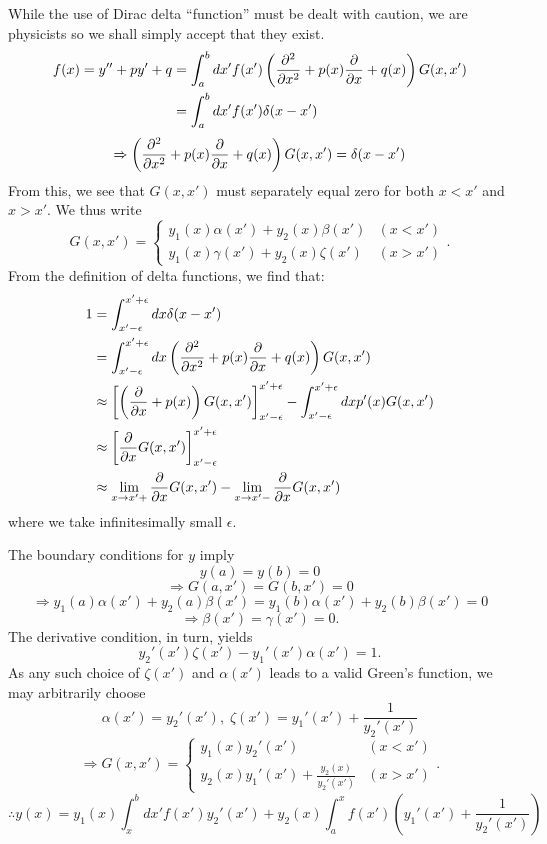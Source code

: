 \item
While the use of Dirac delta ``function'' must be dealt with caution,
we are physicists so we shall simply accept that they exist.
\begin{align*}
	f(x)
	= y'' + py' + q
	&= \int_a^b dx' f(x') \left( \frac{\partial^2}{\partial{}x^2} + p(x) \frac{\partial}{\partial{}x} + q(x) \right) G(x, x') \\
	&= \int_a^b dx' f(x') \delta(x - x')
\end{align*}
\[
	\Rightarrow \left( \frac{\partial^2}{\partial{}x^2} + p(x) \frac{\partial}{\partial{}x} + q(x) \right) G(x, x') = \delta(x - x')
\]
From this, we see that $G(x, x')$ must separately equal zero for both $x < x'$ and $x > x'$.
We thus write
\[
	G(x, x') =
	\begin{cases}
		y_1(x) \alpha(x') + y_2(x) \beta(x') & (x < x') \\
		y_1(x) \gamma(x') + y_2(x) \zeta(x') & (x > x')
	\end{cases}.
\]
From the definition of delta functions, we find that:
\begin{align*}
	1
	&= \int_{x' - \epsilon}^{x' + \epsilon} dx \delta(x - x') \\
	&= \int_{x' - \epsilon}^{x' + \epsilon} dx \left( \frac{\partial^2}{\partial{}x^2} + p(x) \frac{\partial}{\partial{}x} + q(x) \right) G(x, x') \\
	&\approx {\left[ \left( \frac{\partial}{\partial{}x} + p(x) \right) G(x, x') \right]}_{x' - \epsilon}^{x' + \epsilon}
		     - \int_{x' - \epsilon}^{x' + \epsilon} dx p'(x) G(x, x') \\
	&\approx {\left[ \frac{\partial}{\partial{}x} G(x, x') \right]}_{x' - \epsilon}^{x' + \epsilon} \\
	&\approx \lim_{x \rightarrow x'+} \frac{\partial}{\partial{}x} G(x, x') - \lim_{x \rightarrow x'-} \frac{\partial}{\partial{}x} G(x, x')
\end{align*}
where we take infinitesimally small $\epsilon$.

The boundary conditions for $y$ imply
\[
	y(a) = y(b) = 0
\]
\[
	\Rightarrow G(a, x') = G(b, x') = 0
\]
\[
	\Rightarrow y_1(a)\alpha(x') + y_2(a)\beta(x') = y_1(b)\alpha(x') + y_2(b)\beta(x') = 0
\]
\[
	\Rightarrow \beta(x') = \gamma(x') = 0.
\]
The derivative condition, in turn, yields
\[
	y_2'(x')\zeta(x') - y_1'(x')\alpha(x') = 1.
\]
As any such choice of $\zeta(x')$ and $\alpha(x')$ leads to a valid Green's function,
we may arbitrarily choose
\[
	\alpha(x') = y_2'(x'),\; \zeta(x') = y_1'(x') + \frac{1}{y_2'(x')}
\]
\[
	\Rightarrow G(x, x') =
	\begin{cases}
		y_1(x)y_2'(x') & (x < x') \\
		y_2(x)y_1'(x') + \frac{y_2(x)}{y_2'(x')} & (x > x')
	\end{cases}.
\]
\[
	\therefore y(x)
	= y_1(x) \int_x^b dx' f(x') y_2'(x') + y_2(x) \int_a^x f(x') \left( y_1'(x') + \frac{1}{y_2'(x')} \right)
\]

